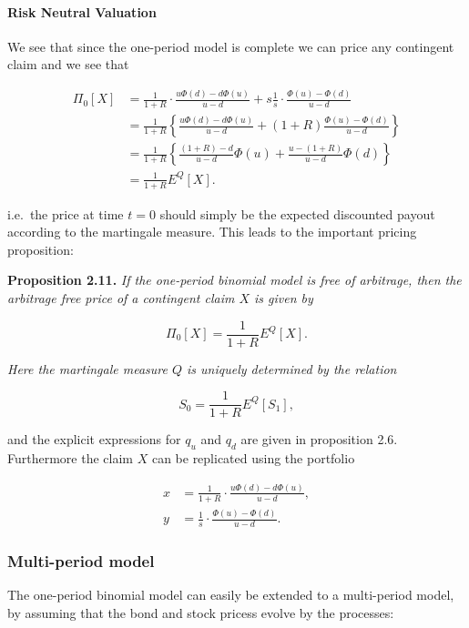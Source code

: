 \documentclass[
]{article}
\begin{document}
\hypertarget{risk-neutral-valuation}{%
\paragraph{Risk Neutral Valuation}\label{risk-neutral-valuation}}

We see that since the one-period model is complete we can price any
contingent claim and we see that

\begin{align*}
\Pi_0[X]&=\frac{1}{1+R}\cdot\frac{u\Phi(d)-d\Phi(u)}{u-d}+s\frac{1}{s}\cdot\frac{\Phi(u)-\Phi(d)}{u-d}\\
&=\frac{1}{1+R}\left\{\frac{u\Phi(d)-d\Phi(u)}{u-d}+(1+R)\frac{\Phi(u)-\Phi(d)}{u-d}\right\}\\
&=\frac{1}{1+R}\left\{\frac{(1+R)-d}{u-d}\Phi(u)+\frac{u-(1+R)}{u-d}\Phi(d)\right\}\\
&=\frac{1}{1+R}E^Q[X].
\end{align*}

i.e.~the price at time \(t=0\) should simply be the expected discounted
payout according to the martingale measure. This leads to the important
pricing proposition:

\textbf{Proposition 2.11.} \emph{If the one-period binomial model is
free of arbitrage, then the arbitrage free price of a contingent claim
\(X\) is given by}

\[
\Pi_0[X]=\frac{1}{1+R}E^Q[X].\tag{2.4}
\]

\emph{Here the martingale measure \(Q\) is uniquely determined by the
relation}

\[
S_0=\frac{1}{1+R}E^Q[S_1],\tag{2.5}
\]

and the explicit expressions for \(q_u\) and \(q_d\) are given in
proposition 2.6. Furthermore the claim \(X\) can be replicated using the
portfolio

\begin{align*}
x&=\frac{1}{1+R}\cdot\frac{u\Phi(d)-d\Phi(u)}{u-d},\tag{2.6}\\
y&=\frac{1}{s}\cdot\frac{\Phi(u)-\Phi(d)}{u-d}.\tag{2.7}
\end{align*}

\hypertarget{multi-period-model}{%
\subsubsection{Multi-period model}\label{multi-period-model}}

The one-period binomial model can easily be extended to a multi-period
model, by assuming that the bond and stock pricess evolve by the
processes:
\end{document}

